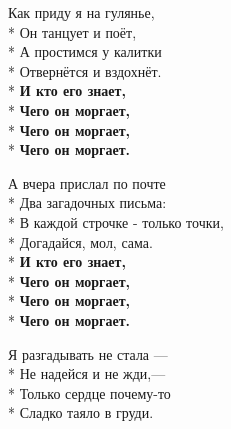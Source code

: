 \medskip

\begin{minipage}{\linewidth}
Как приду я на гулянье,\\*
Он танцует и поёт,\\*
А простимся у калитки\\*
Отвернётся и вздохнёт.\\*
\hspace*{1.5em}\textbf{И кто его знает,}\\*
\hspace*{1.5em}\textbf{Чего он моргает,}\\*
\hspace*{1.5em}\textbf{Чего он моргает,}\\*
\hspace*{1.5em}\textbf{Чего он моргает.}\\
\end{minipage}\par\medskip\nobreak

\medskip

\begin{minipage}{\linewidth}
А вчера прислал по почте\\*
Два загадочных письма:\\*
В каждой строчке - только точки,\\*
Догадайся, мол, сама.\\*
\hspace*{1.5em}\textbf{И кто его знает,}\\*
\hspace*{1.5em}\textbf{Чего он моргает,}\\*
\hspace*{1.5em}\textbf{Чего он моргает,}\\*
\hspace*{1.5em}\textbf{Чего он моргает.}\\
\end{minipage}\par\medskip\nobreak

\medskip

\begin{minipage}{\linewidth}
Я разгадывать не стала —\\*
Не надейся и не жди,—\\*
Только сердце почему-то\\*
Сладко таяло в груди.\\
\end{minipage}

\vspace{\fill}\newpage

